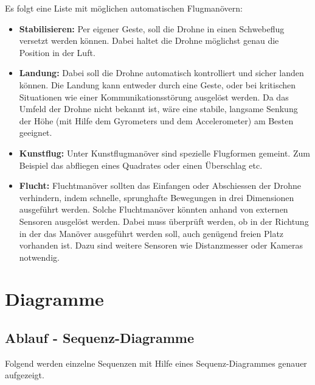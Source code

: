 Es folgt eine Liste mit möglichen automatischen Flugmanövern:
\begin{itemize}
	\item \textbf{Stabilisieren:}
	Per eigener Geste, soll die Drohne in einen Schwebeflug versetzt werden können. Dabei haltet die Drohne möglichst genau die Position in der Luft.

	\item \textbf{Landung:}
	Dabei soll die Drohne automatisch kontrolliert und sicher landen können. Die Landung kann entweder durch eine Geste, oder bei kritischen Situationen wie einer Kommunikationsstörung ausgelöst werden.
	Da das Umfeld der Drohne nicht bekannt ist, wäre eine stabile, langsame Senkung der Höhe (mit Hilfe dem Gyrometers und dem Accelerometer) am Besten geeignet.

	\item \textbf{Kunstflug:}
	Unter Kunstflugmanöver sind spezielle Flugformen gemeint. Zum Beispiel das abfliegen eines Quadrates oder einen Überschlag etc.
	
	\item \textbf{Flucht:}
	Fluchtmanöver sollten das Einfangen oder Abschiessen der Drohne verhindern, indem schnelle, sprunghafte Bewegungen in drei Dimensionen ausgeführt werden.
	Solche Fluchtmanöver könnten anhand von externen Sensoren ausgelöst werden.
	Dabei muss überprüft werden, ob in der Richtung in der das Manöver ausgeführt werden soll, auch genügend freien Platz vorhanden ist.
	Dazu sind weitere Sensoren wie Distanzmesser oder Kameras notwendig.
	
\end{itemize}


\newpage
\section{Diagramme}

\subsection{Ablauf - Sequenz-Diagramme}
Folgend werden einzelne Sequenzen mit Hilfe eines Sequenz-Diagrammes genauer aufgezeigt.

